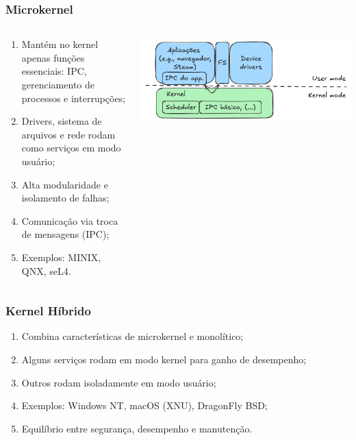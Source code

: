 \documentclass{beamer}
\begin{document}
\begin{frame}[fragile]
    \frametitle{Microkernel}

    \begin{columns}
        \begin{column}{0.4\textwidth}
            \begin{enumerate}\footnotesize
                \item Mantém no kernel apenas funções essenciais: IPC, gerenciamento de processos e interrupções;
                \item Drivers, sistema de arquivos e rede rodam como serviços em modo usuário;
                \item Alta modularidade e isolamento de falhas;
                \item Comunicação via troca de mensagens (IPC);
                \item Exemplos: MINIX, QNX, seL4.
            \end{enumerate}
        \end{column}
        \begin{column}{0.6\textwidth}
            \begin{center}
                \includegraphics[width=\textwidth]{../figures/microkernel.png}
            \end{center}
        \end{column}
    \end{columns}
\end{frame}

\begin{frame}[fragile]
    \frametitle{Kernel Híbrido}

    \begin{enumerate}\small
        \item Combina características de microkernel e monolítico;
        \item Alguns serviços rodam em modo kernel para ganho de desempenho;
        \item Outros rodam isoladamente em modo usuário;
        \item Exemplos: Windows NT, macOS (XNU), DragonFly BSD;
        \item Equilíbrio entre segurança, desempenho e manutenção.
    \end{enumerate}
\end{frame}
\end{document}
